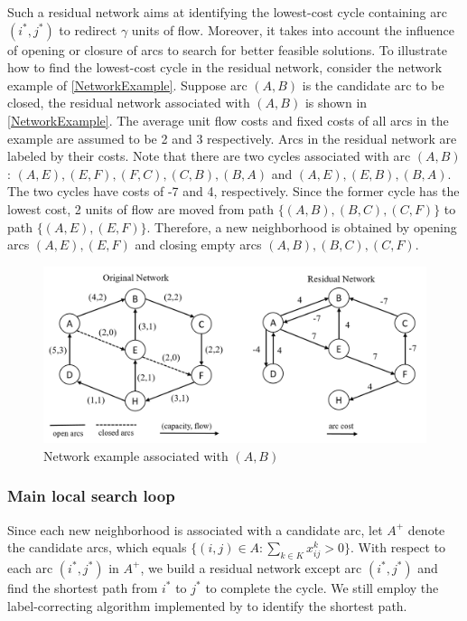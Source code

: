\documentclass[11pt,nonblindrev,fleqn]{article}
\begin{document}
Such a residual network aims at identifying the lowest-cost cycle containing arc $(i^*,j^*)$ to redirect $\gamma$ units of flow. Moreover, it takes into account the influence of opening or closure of arcs to search for better feasible solutions. To illustrate how to find the lowest-cost cycle in the residual network, consider the network example of \autoref{NetworkExample}. Suppose arc $(A,B)$ is the candidate arc to be closed, the residual network associated with $(A,B)$ is shown in \autoref{NetworkExample}. The average unit flow costs and fixed costs of all arcs in the example are assumed to be 2 and 3 respectively. Arcs in the residual network are labeled by their costs. Note that there are two cycles associated with arc $(A,B)$: $(A,E),(E,F),(F,C),(C,B),(B,A)$ and $(A,E),(E,B),(B,A)$. The two cycles have costs of -7 and 4, respectively. Since the former cycle has the lowest cost, 2 units of flow are moved from path $\{(A,B),(B,C),(C,F)\}$ to path $\{(A,E),(E,F)\}$. Therefore, a new neighborhood is obtained by opening arcs $(A,E),(E,F)$ and closing empty arcs $(A,B),(B,C),(C,F)$.
\begin{figure}[H]
\setlength{\abovecaptionskip}{-5pt}
\setlength{\belowcaptionskip}{-5pt}
\centering
\includegraphics[width=0.8\linewidth]{F3.png}
\caption{Network example associated with $(A,B)$}
\label{NetworkExample}
\end{figure}

\subsubsection{Main local search loop}
Since each new neighborhood is associated with a candidate arc, let $A^+$ denote the candidate arcs, which equals $\{ (i,j)\in A: \sum_{k\in K} x_{ij}^k > 0 \}$. With respect to each arc $(i^*,j^*)$ in $A^+$, we build a residual network except arc $(i^*,j^*)$ and find the shortest path from $i^*$ to $j^*$ to complete the cycle. We still employ the label-correcting algorithm implemented by \cite{Ahuja1993Network} to identify the shortest path.
\end{document}
